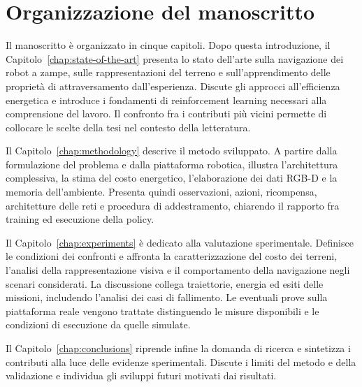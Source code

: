 
\section{Organizzazione del manoscritto}
\label{sec:intro-organizzazione}

Il manoscritto è organizzato in cinque capitoli. Dopo questa introduzione, il Capitolo~\ref{chap:state-of-the-art} presenta lo stato dell'arte sulla navigazione dei robot a zampe, sulle rappresentazioni del terreno e sull'apprendimento delle proprietà di attraversamento dall'esperienza. Discute gli approcci all'efficienza energetica e introduce i fondamenti di reinforcement learning necessari alla comprensione del lavoro. Il confronto fra i contributi più vicini permette di collocare le scelte della tesi nel contesto della letteratura.

Il Capitolo~\ref{chap:methodology} descrive il metodo sviluppato. A partire dalla formulazione del problema e dalla piattaforma robotica, illustra l'architettura complessiva, la stima del costo energetico, l'elaborazione dei dati RGB-D e la memoria dell'ambiente. Presenta quindi osservazioni, azioni, ricompensa, architetture delle reti e procedura di addestramento, chiarendo il rapporto fra training ed esecuzione della policy.

Il Capitolo~\ref{chap:experiments} è dedicato alla valutazione sperimentale. Definisce le condizioni dei confronti e affronta la caratterizzazione del costo dei terreni, l'analisi della rappresentazione visiva e il comportamento della navigazione negli scenari considerati. La discussione collega traiettorie, energia ed esiti delle missioni, includendo l'analisi dei casi di fallimento. Le eventuali prove sulla piattaforma reale vengono trattate distinguendo le misure disponibili e le condizioni di esecuzione da quelle simulate.

Il Capitolo~\ref{chap:conclusions} riprende infine la domanda di ricerca e sintetizza i contributi alla luce delle evidenze sperimentali. Discute i limiti del metodo e della validazione e individua gli sviluppi futuri motivati dai risultati.
